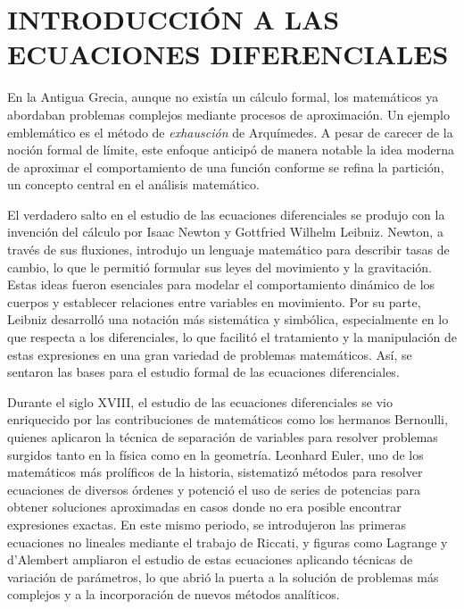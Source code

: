 \chapter[Introducción a las Ecuaciones Diferenciales]{INTRODUCCIÓN A LAS ECUACIONES DIFERENCIALES}
\startcontents
\printchaptertableofcontents

En la Antigua Grecia, aunque no existía un cálculo formal, los matemáticos ya abordaban problemas complejos mediante procesos de aproximación. Un ejemplo emblemático es el método de \textit{exhausción} de Arquímedes. A pesar de carecer de la noción formal de límite, este enfoque anticipó de manera notable la idea moderna de aproximar el comportamiento de una función conforme se refina la partición, un concepto central en el análisis matemático.

El verdadero salto en el estudio de las ecuaciones diferenciales se produjo con la invención del cálculo por Isaac Newton y Gottfried Wilhelm Leibniz. Newton, a través de sus fluxiones, introdujo un lenguaje matemático para describir tasas de cambio, lo que le permitió formular sus leyes del movimiento y la gravitación. Estas ideas fueron esenciales para modelar el comportamiento dinámico de los cuerpos y establecer relaciones entre variables en movimiento. Por su parte, Leibniz desarrolló una notación más sistemática y simbólica, especialmente en lo que respecta a los diferenciales, lo que facilitó el tratamiento y la manipulación de estas expresiones en una gran variedad de problemas matemáticos. Así, se sentaron las bases para el estudio formal de las ecuaciones diferenciales.

Durante el siglo XVIII, el estudio de las ecuaciones diferenciales se vio enriquecido por las contribuciones de matemáticos como los hermanos Bernoulli, quienes aplicaron la técnica de separación de variables para resolver problemas surgidos tanto en la física como en la geometría. Leonhard Euler, uno de los matemáticos
más prolíficos de la historia, sistematizó métodos para resolver ecuaciones de diversos órdenes y potenció el uso de series de potencias para obtener soluciones aproximadas en casos donde no era posible encontrar expresiones exactas. En este mismo periodo, se introdujeron las primeras ecuaciones no lineales mediante el trabajo de Riccati, y figuras como Lagrange y d’Alembert ampliaron el estudio de estas ecuaciones aplicando técnicas de variación de parámetros, lo que abrió la puerta a la solución de problemas más complejos y a la incorporación de nuevos métodos analíticos.

